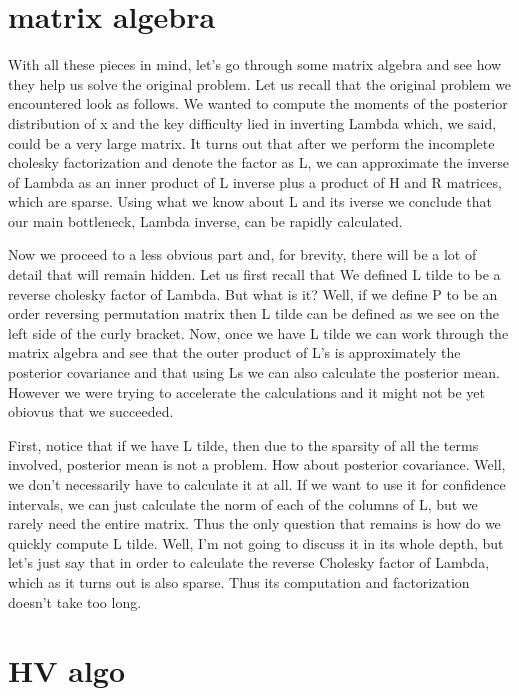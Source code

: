 \documentclass[12pt]{article} %
\begin{document}
\newpage
\section*{matrix algebra}


With all these pieces in mind, let's go through some matrix algebra and see how they help us solve the original problem. Let us recall that the original problem we encountered look as follows. We wanted to compute the moments of the posterior distribution of x and the key difficulty lied in inverting Lambda which, we said, could be a very large matrix.
It turns out that after we perform the incomplete cholesky factorization and denote the factor as L, we can approximate the inverse of Lambda as an inner product of L inverse plus a product of H and R matrices, which are sparse. Using what we know about L and its iverse we conclude that our main bottleneck, Lambda inverse, can be rapidly calculated.

Now we proceed to a less obvious part and, for brevity, there will be a lot of detail that will remain hidden. Let us first recall that We defined L tilde to be a reverse cholesky factor of Lambda. But what is it? Well, if we define P to be an order reversing permutation matrix then L tilde can be defined as we see on the left side of the curly bracket. Now, once we have L tilde we can work through the matrix algebra and see that the outer product of L's is approximately the posterior covariance and that using Ls we can also calculate the posterior mean. However we were trying to accelerate the calculations and it might not be yet obiovus that we succeeded. 

First, notice that if we have L tilde, then due to the sparsity of all the terms involved, posterior mean is not a problem. How about posterior covariance. Well, we don't necessarily have to calculate it at all. If we want to use it for confidence intervals, we can just calculate the norm of each of the columns of L, but we rarely need the entire matrix. Thus the only question that remains is how do we quickly compute L tilde. Well, I'm not going to discuss it in its whole depth, but let's just say that in order to calculate the reverse Cholesky factor of Lambda, which as it turns out is also sparse. Thus its computation and factorization doesn't take too long.



\newpage
\section*{HV algo}
\end{document}
